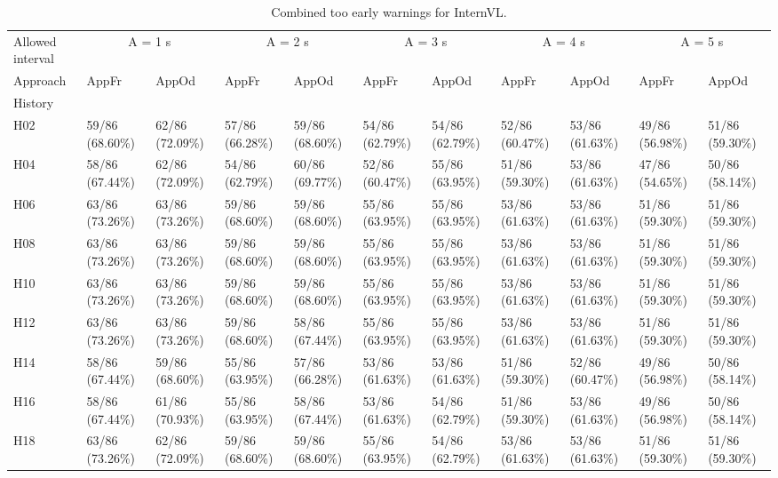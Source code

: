 \begin{table}[tbp]
\caption{Combined too early warnings for InternVL.}
\label{tab:rq4-internvl-too-early-paper-table}
\begin{tabular}{lllllllllll}
\toprule
Allowed interval & \multicolumn{2}{c}{A = 1 s} & \multicolumn{2}{c}{A = 2 s} & \multicolumn{2}{c}{A = 3 s} & \multicolumn{2}{c}{A = 4 s} & \multicolumn{2}{c}{A = 5 s} \\
Approach & AppFr & AppOd & AppFr & AppOd & AppFr & AppOd & AppFr & AppOd & AppFr & AppOd \\
History &  &  &  &  &  &  &  &  &  &  \\
\midrule
H02 & 59/86 (68.60\%) & 62/86 (72.09\%) & 57/86 (66.28\%) & 59/86 (68.60\%) & 54/86 (62.79\%) & 54/86 (62.79\%) & 52/86 (60.47\%) & 53/86 (61.63\%) & 49/86 (56.98\%) & 51/86 (59.30\%) \\
H04 & 58/86 (67.44\%) & 62/86 (72.09\%) & 54/86 (62.79\%) & 60/86 (69.77\%) & 52/86 (60.47\%) & 55/86 (63.95\%) & 51/86 (59.30\%) & 53/86 (61.63\%) & 47/86 (54.65\%) & 50/86 (58.14\%) \\
H06 & 63/86 (73.26\%) & 63/86 (73.26\%) & 59/86 (68.60\%) & 59/86 (68.60\%) & 55/86 (63.95\%) & 55/86 (63.95\%) & 53/86 (61.63\%) & 53/86 (61.63\%) & 51/86 (59.30\%) & 51/86 (59.30\%) \\
H08 & 63/86 (73.26\%) & 63/86 (73.26\%) & 59/86 (68.60\%) & 59/86 (68.60\%) & 55/86 (63.95\%) & 55/86 (63.95\%) & 53/86 (61.63\%) & 53/86 (61.63\%) & 51/86 (59.30\%) & 51/86 (59.30\%) \\
H10 & 63/86 (73.26\%) & 63/86 (73.26\%) & 59/86 (68.60\%) & 59/86 (68.60\%) & 55/86 (63.95\%) & 55/86 (63.95\%) & 53/86 (61.63\%) & 53/86 (61.63\%) & 51/86 (59.30\%) & 51/86 (59.30\%) \\
H12 & 63/86 (73.26\%) & 63/86 (73.26\%) & 59/86 (68.60\%) & 58/86 (67.44\%) & 55/86 (63.95\%) & 55/86 (63.95\%) & 53/86 (61.63\%) & 53/86 (61.63\%) & 51/86 (59.30\%) & 51/86 (59.30\%) \\
H14 & 58/86 (67.44\%) & 59/86 (68.60\%) & 55/86 (63.95\%) & 57/86 (66.28\%) & 53/86 (61.63\%) & 53/86 (61.63\%) & 51/86 (59.30\%) & 52/86 (60.47\%) & 49/86 (56.98\%) & 50/86 (58.14\%) \\
H16 & 58/86 (67.44\%) & 61/86 (70.93\%) & 55/86 (63.95\%) & 58/86 (67.44\%) & 53/86 (61.63\%) & 54/86 (62.79\%) & 51/86 (59.30\%) & 53/86 (61.63\%) & 49/86 (56.98\%) & 50/86 (58.14\%) \\
H18 & 63/86 (73.26\%) & 62/86 (72.09\%) & 59/86 (68.60\%) & 59/86 (68.60\%) & 55/86 (63.95\%) & 54/86 (62.79\%) & 53/86 (61.63\%) & 53/86 (61.63\%) & 51/86 (59.30\%) & 51/86 (59.30\%) \\

\end{tabular}
\end{table}
